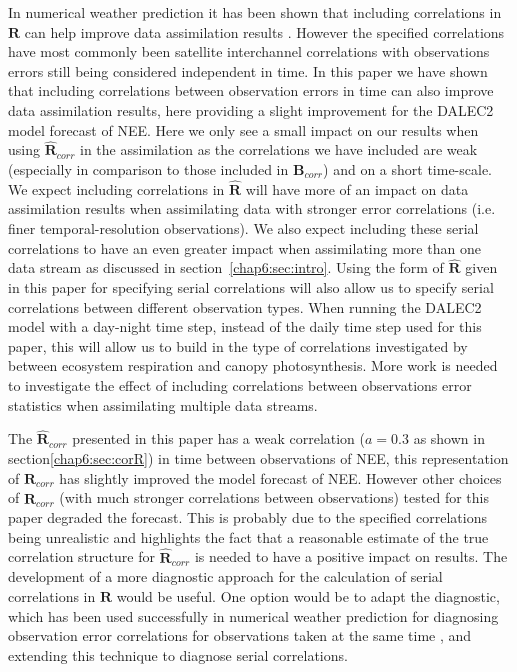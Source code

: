 In numerical weather prediction it has been shown that including correlations in $\textbf{R}$ can help improve data assimilation results \citep{weston2014accounting, Stewart2013}. However the specified correlations have most commonly been satellite interchannel correlations with observations errors still being considered independent in time. In this paper we have shown that including correlations between observation errors in time can also improve data assimilation results, here providing a slight improvement for the DALEC2 model forecast of NEE. Here we only see a small impact on our results when using $\hat{\mathbf{R}}_{corr}$ in the assimilation as the correlations we have included are weak (especially in comparison to those included in ${\mathbf{B}}_{corr}$)  and on a short time-scale. We expect including correlations in $\hat{\textbf{R}}$ will have more of an impact on data assimilation results when assimilating data with stronger error correlations (i.e. finer temporal-resolution observations). We also expect including these serial correlations to have an even greater impact when assimilating more than one data stream as discussed in section~\ref{chap6:sec:intro}. Using the form of $\hat{\mathbf{R}}$ given in this paper for specifying serial correlations will also allow us to specify serial correlations between different observation types. When running the DALEC2 model with a day-night time step, instead of the daily time step used for this paper, this will allow us to build in the type of correlations investigated by \citet{Baldocchi2015} between ecosystem respiration and canopy photosynthesis. More work is needed to investigate the effect of including correlations between observations error statistics when assimilating multiple data streams.

The $\hat{\mathbf{R}}_{corr}$ presented in this paper has a weak correlation ($a=0.3$ as shown in section\ref{chap6:sec:corR}) in time between observations of NEE, this representation of $\hat{\mathbf{R}}_{corr}$ has slightly improved the model forecast of NEE. However other choices of $\hat{\mathbf{R}}_{corr}$ (with much stronger correlations between observations) tested for this paper degraded the forecast. This is probably due to the specified correlations being unrealistic and highlights the fact that a reasonable estimate of the true correlation structure for $\hat{\mathbf{R}}_{corr}$ is needed to have a positive impact on results. The development of a more diagnostic approach for the calculation of serial correlations in $\hat{\mathbf{R}}$ would be useful. One option would be to adapt the \citet{desroziers2005diagnosis} diagnostic, which has been used successfully in numerical weather prediction for diagnosing observation error correlations for observations taken at the same time \citep{weston2014accounting}, and extending this technique to diagnose serial correlations.

